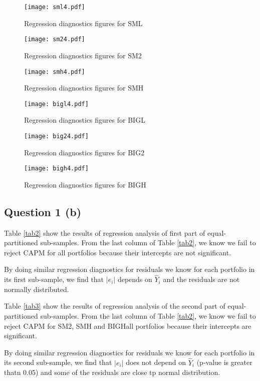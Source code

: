 \documentclass[11pt]{article}
\begin{document}
\begin{figure}
\centering
\texttt{[image: sml4.pdf]}
\caption{Regression diagnostics figures for SML }
\label{sml4}
\end{figure}
\begin{figure}
\texttt{[image: sm24.pdf]}
\caption{Regression diagnostics figures for SM2}
\label{sm24}
\end{figure}
\begin{figure}
\centering
\texttt{[image: smh4.pdf]}
\caption{Regression diagnostics figures for SMH}
\label{smh4}
\end{figure}
\begin{figure}
\texttt{[image: bigl4.pdf]}
\caption{Regression diagnostics figures for BIGL}
\label{bigl4}
\end{figure}
\begin{figure}
\centering
\texttt{[image: big24.pdf]}
\caption{Regression diagnostics figures for BIG2}
\label{big24}
\end{figure}
\begin{figure}
\texttt{[image: bigh4.pdf]}
\caption{Regression diagnostics figures for BIGH}
\label{bigh4}
\end{figure}
\clearpage
\subsection{Question 1 (b)}
Table \ref{tab2} show the results of regression analysis of first part of equal-partitioned sub-samples. From the last column of Table \ref{tab2}, we know we fail to reject CAPM for all portfolios because their intercepts are not significant.

By doing similar regression diagnostics for residuals we know for each portfolio in its first sub-sample, we find that $|e_i|$ depends on $\hat{Y}_i$ and the residuals are not normally distributed. 

Table \ref{tab3} show the results of regression analysis of the second part of equal-partitioned sub-samples. From the last column of Table \ref{tab2}, we know we fail to reject CAPM for SM2, SMH and BIGHall portfolios because their intercepts are significant. 

By doing similar regression diagnostics for residuals we know for each portfolio in its second sub-sample, we find that $|e_i|$ does not depend on $\hat{Y}_i$ (p-value is greater thatn 0.05) and some of the residuals are close tp normal distribution. 
\end{document}
